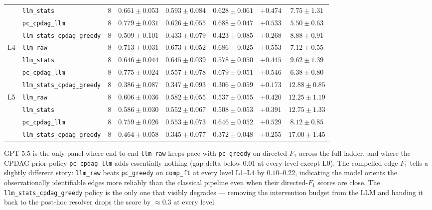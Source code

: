 \begin{center}
\begin{tabular}{@{}l l c c c c c c@{}}
   & \texttt{llm\_stats}              & 8 & $0.661 \pm 0.053$ & $0.593 \pm 0.084$ & $0.628 \pm 0.061$ & $+0.474$ & $7.75 \pm 1.31$ \\
   & \texttt{pc\_cpdag\_llm}          & 8 & $0.779 \pm 0.031$ & $0.626 \pm 0.055$ & $0.688 \pm 0.047$ & $+0.533$ & $5.50 \pm 0.63$ \\
   & \texttt{llm\_stats\_cpdag\_greedy} & 8 & $0.509 \pm 0.101$ & $0.433 \pm 0.079$ & $0.423 \pm 0.085$ & $+0.268$ & $8.88 \pm 0.91$ \\
\midrule
L4 & \texttt{llm\_raw}                & 8 & $0.713 \pm 0.031$ & $0.673 \pm 0.052$ & $0.686 \pm 0.025$ & $+0.553$ & $7.12 \pm 0.55$ \\
   & \texttt{llm\_stats}              & 8 & $0.646 \pm 0.044$ & $0.645 \pm 0.039$ & $0.578 \pm 0.050$ & $+0.445$ & $9.62 \pm 1.39$ \\
   & \texttt{pc\_cpdag\_llm}          & 8 & $0.775 \pm 0.024$ & $0.557 \pm 0.078$ & $0.679 \pm 0.051$ & $+0.546$ & $6.38 \pm 0.80$ \\
   & \texttt{llm\_stats\_cpdag\_greedy} & 8 & $0.386 \pm 0.087$ & $0.347 \pm 0.093$ & $0.306 \pm 0.059$ & $+0.173$ & $12.88 \pm 0.85$ \\
\midrule
L5 & \texttt{llm\_raw}                & 8 & $0.606 \pm 0.036$ & $0.582 \pm 0.055$ & $0.537 \pm 0.055$ & $+0.420$ & $12.25 \pm 1.19$ \\
   & \texttt{llm\_stats}              & 8 & $0.586 \pm 0.030$ & $0.552 \pm 0.067$ & $0.508 \pm 0.053$ & $+0.391$ & $12.75 \pm 1.33$ \\
   & \texttt{pc\_cpdag\_llm}          & 8 & $0.759 \pm 0.026$ & $0.553 \pm 0.073$ & $0.646 \pm 0.052$ & $+0.529$ & $8.12 \pm 0.85$ \\
   & \texttt{llm\_stats\_cpdag\_greedy} & 8 & $0.464 \pm 0.058$ & $0.345 \pm 0.077$ & $0.372 \pm 0.048$ & $+0.255$ & $17.00 \pm 1.45$ \\
\bottomrule
\end{tabular}
\end{center}

GPT-5.5 is the only panel where end-to-end \texttt{llm\_raw} keeps pace with \texttt{pc\_greedy} on directed $F_1$ across the full ladder, and where the CPDAG-prior policy \texttt{pc\_cpdag\_llm} adds essentially nothing (gap delta below $0.01$ at every level except L0). The compelled-edge $F_1$ tells a slightly different story: \texttt{llm\_raw} beats \texttt{pc\_greedy} on \texttt{comp\_f1} at every level L1--L4 by $0.10$--$0.22$, indicating the model orients the observationally identifiable edges more reliably than the classical pipeline even when their directed-$F_1$ scores are close. The \texttt{llm\_stats\_cpdag\_greedy} policy is the only one that visibly degrades --- removing the intervention budget from the LLM and handing it back to the post-hoc resolver drops the score by $\approx 0.3$ at every level.

